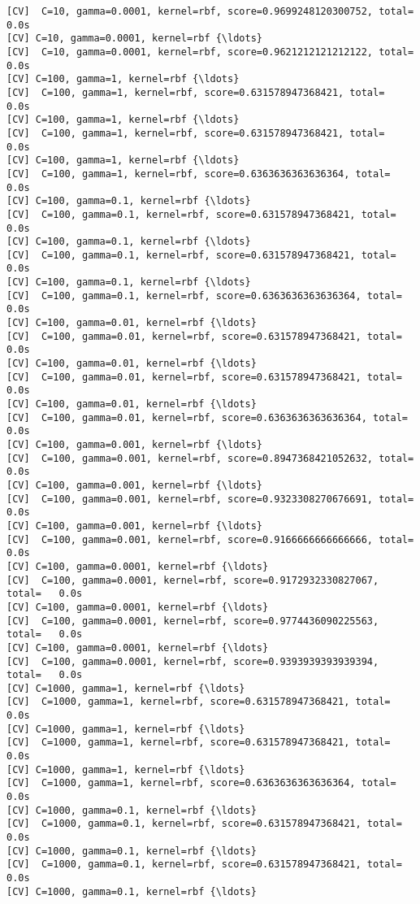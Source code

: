 \documentclass[11pt]{article}
\begin{document}
\begin{Verbatim}[commandchars=\\\{\}]
[CV]  C=10, gamma=0.0001, kernel=rbf, score=0.9699248120300752, total=   0.0s
[CV] C=10, gamma=0.0001, kernel=rbf {\ldots}
[CV]  C=10, gamma=0.0001, kernel=rbf, score=0.9621212121212122, total=   0.0s
[CV] C=100, gamma=1, kernel=rbf {\ldots}
[CV]  C=100, gamma=1, kernel=rbf, score=0.631578947368421, total=   0.0s
[CV] C=100, gamma=1, kernel=rbf {\ldots}
[CV]  C=100, gamma=1, kernel=rbf, score=0.631578947368421, total=   0.0s
[CV] C=100, gamma=1, kernel=rbf {\ldots}
[CV]  C=100, gamma=1, kernel=rbf, score=0.6363636363636364, total=   0.0s
[CV] C=100, gamma=0.1, kernel=rbf {\ldots}
[CV]  C=100, gamma=0.1, kernel=rbf, score=0.631578947368421, total=   0.0s
[CV] C=100, gamma=0.1, kernel=rbf {\ldots}
[CV]  C=100, gamma=0.1, kernel=rbf, score=0.631578947368421, total=   0.0s
[CV] C=100, gamma=0.1, kernel=rbf {\ldots}
[CV]  C=100, gamma=0.1, kernel=rbf, score=0.6363636363636364, total=   0.0s
[CV] C=100, gamma=0.01, kernel=rbf {\ldots}
[CV]  C=100, gamma=0.01, kernel=rbf, score=0.631578947368421, total=   0.0s
[CV] C=100, gamma=0.01, kernel=rbf {\ldots}
[CV]  C=100, gamma=0.01, kernel=rbf, score=0.631578947368421, total=   0.0s
[CV] C=100, gamma=0.01, kernel=rbf {\ldots}
[CV]  C=100, gamma=0.01, kernel=rbf, score=0.6363636363636364, total=   0.0s
[CV] C=100, gamma=0.001, kernel=rbf {\ldots}
[CV]  C=100, gamma=0.001, kernel=rbf, score=0.8947368421052632, total=   0.0s
[CV] C=100, gamma=0.001, kernel=rbf {\ldots}
[CV]  C=100, gamma=0.001, kernel=rbf, score=0.9323308270676691, total=   0.0s
[CV] C=100, gamma=0.001, kernel=rbf {\ldots}
[CV]  C=100, gamma=0.001, kernel=rbf, score=0.9166666666666666, total=   0.0s
[CV] C=100, gamma=0.0001, kernel=rbf {\ldots}
[CV]  C=100, gamma=0.0001, kernel=rbf, score=0.9172932330827067, total=   0.0s
[CV] C=100, gamma=0.0001, kernel=rbf {\ldots}
[CV]  C=100, gamma=0.0001, kernel=rbf, score=0.9774436090225563, total=   0.0s
[CV] C=100, gamma=0.0001, kernel=rbf {\ldots}
[CV]  C=100, gamma=0.0001, kernel=rbf, score=0.9393939393939394, total=   0.0s
[CV] C=1000, gamma=1, kernel=rbf {\ldots}
[CV]  C=1000, gamma=1, kernel=rbf, score=0.631578947368421, total=   0.0s
[CV] C=1000, gamma=1, kernel=rbf {\ldots}
[CV]  C=1000, gamma=1, kernel=rbf, score=0.631578947368421, total=   0.0s
[CV] C=1000, gamma=1, kernel=rbf {\ldots}
[CV]  C=1000, gamma=1, kernel=rbf, score=0.6363636363636364, total=   0.0s
[CV] C=1000, gamma=0.1, kernel=rbf {\ldots}
[CV]  C=1000, gamma=0.1, kernel=rbf, score=0.631578947368421, total=   0.0s
[CV] C=1000, gamma=0.1, kernel=rbf {\ldots}
[CV]  C=1000, gamma=0.1, kernel=rbf, score=0.631578947368421, total=   0.0s
[CV] C=1000, gamma=0.1, kernel=rbf {\ldots}

\end{Verbatim}
\end{document}
